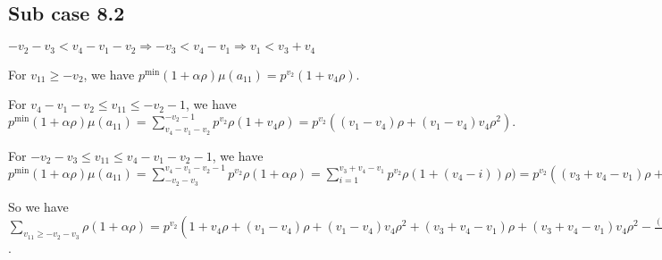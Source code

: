 \documentclass{article}
\begin{document}
\subsection{Sub case 8.2}

$-v_2-v_3<{v_4-v_1-v_2}\Rightarrow{-v_3<{v_4-v_1}}\Rightarrow{v_1<{v_3+v_4}}$

For $v_{11}\geq{-v_2}$, we have $p^{\min}(1+\alpha\rho)\mu(a_{11})=p^{v_2}(1+v_4\rho).$

For $v_4-v_1-v_2\leq{v_{11}}\leq{-v_2-1}$, we have $p^{\min}(1+\alpha\rho)\mu(a_{11})=\sum_{v_4-v_1-v_2}^{-v_2-1}p^{v_2}\rho(1+v_4\rho)=p^{v_2}((v_1-v_4)\rho+(v_1-v_4)v_4\rho^2).$

For $-v_2-v_3\leq{v_{11}}\leq{v_4-v_1-v_2-1}$, we have $p^{\min}(1+\alpha\rho)\mu(a_{11})=\sum_{-v_2-v_3}^{v_4-v_1-v_2-1}p^{v_2}\rho(1+\alpha\rho)=\sum_{i=1}^{v_3+v_4-v_1}p^{v_2}\rho(1+(v_4-i))\rho)=p^{v_2}((v_3+v_4-v_1)\rho+(v_3+v_4-v_1)v_4\rho^2-\binom{v_3+v_4-v_1+1}{2}\rho^2).$

So we have $\sum_{v_{11}\geq{-v_2-v_3}}\rho(1+\alpha\rho)=p^{v_2}(
1+v_4\rho+(v_1-v_4)\rho+(v_1-v_4)v_4\rho^2+
(v_3+v_4-v_1)\rho+(v_3+v_4-v_1)v_4\rho^2-\frac{(v_3+v_4-v_1+1)(v_3+v_4-v_1)}{2}\rho^2)=p^{v_2}(1+v_3\rho+v_4\rho-\frac{v_3^2}{2}\rho^2+v_1v_3\rho^2-\frac{v_4^2}{2}+v_1v_4\rho^2-\frac{v_1^2}{2}-v_3\rho^2-v_4\rho^2+v_1\rho^2)$.
\end{document}
